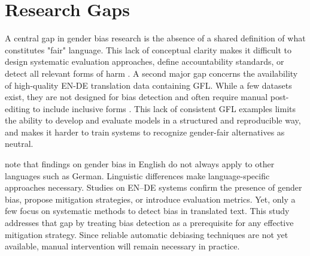 
    \section{Research Gaps}
    A central gap in gender bias research is the absence of a shared definition of what constitutes "fair" language. This lack of conceptual clarity makes it difficult to design systematic evaluation approaches, define accountability standards, or detect all relevant forms of harm \parencite{barclayInvestigatingMarkersDrivers2024a,shresthaExploringGenderBiases2022,stanczakSurveyGenderBias2021}. A second major gap concerns the availability of high-quality EN-DE translation data containing GFL. While a few datasets exist, they are not designed for bias detection and often require manual post-editing to include inclusive forms \parencite{lardelliBuildingBridgesDataset2024}. This lack of consistent GFL examples limits the ability to develop and evaluate models in a structured and reproducible way, and makes it harder to train systems to recognize gender-fair alternatives as neutral.

    \textcite{stanczakSurveyGenderBias2021} note that findings on gender bias in English do not always apply to other languages such as German. Linguistic differences make language-specific approaches necessary. Studies on EN–DE systems \parencite{ullmannGenderBiasMachine2022,kapplAreAllSpanish2025,lardelliBuildingBridgesDataset2024} confirm the presence of gender bias, propose mitigation strategies, or introduce evaluation metrics. Yet, only a few focus on systematic methods to detect bias in translated text. This study addresses that gap by treating bias detection as a prerequisite for any effective mitigation strategy. Since reliable automatic debiasing techniques are not yet available, manual intervention will remain necessary in practice.


